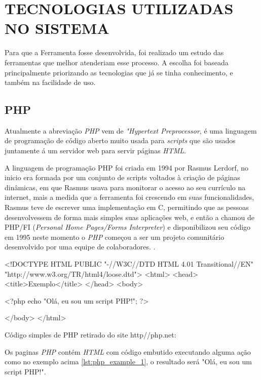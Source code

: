 \chapter{TECNOLOGIAS UTILIZADAS NO SISTEMA}

Para que a Ferramenta fosse desenvolvida, foi realizado um estudo das ferramentas que melhor atenderiam esse processo. A escolha foi baseada principalmente priorizando as tecnologias que já se tinha conhecimento, e também na facilidade de uso.

\section{PHP}

Atualmente a abreviação \textit{PHP} vem de \textit{"Hypertext Preprocessor}, é uma linguagem de programação de código aberto muito usada para \textit{scripts} que são usados juntamente á um servidor web para servir páginas \textit{HTML}.
\par
A linguagem de programação PHP foi criada em 1994 por Rasmus Lerdorf, no inicio era formada por um conjunto de scripts voltados à criação de páginas dinâmicas, em que Rasmus usava para monitorar o acesso ao seu currículo na internet, mais a medida que a ferramenta foi crescendo em suas funcionalidades, Rasmus teve de escrever uma implementação em C, permitindo que as pessoas desenvolvessem de forma mais simples suas aplicações web, e então a chamou de PHP/FI (\textit{Personal Home Pages/Forms Interpreter}) e disponibilizou seu código em 1995 neste momento o \textit{PHP} começou a ser um projeto comunitário desenvolvido por uma equipe de colaboradores. \cite[p.~20]{pablo-php}.
\par
\begin{listing}
    \begin{phpcode}
    <!DOCTYPE HTML PUBLIC "-//W3C//DTD HTML 4.01 Transitional//EN"
    "http://www.w3.org/TR/html4/loose.dtd">
    <html>
        <head>
            <title>Exemplo</title>
        </head>
        <body>
    
        <?php
            echo "Olá, eu sou um script PHP!";
        ?>
    
        </body>
    </html>
    \end{phpcode}
    \caption{Código simples de PHP retirado do site http//php.net:}
    \label{lst:php_example_1}
\end{listing}
\par
Os paginas \textit{PHP} contém \textit{HTML} com código embutido executando alguma ação como no exemplo acima \ref{lst:php_example_1}, o resultado será "Olá, eu sou um script PHP!".

